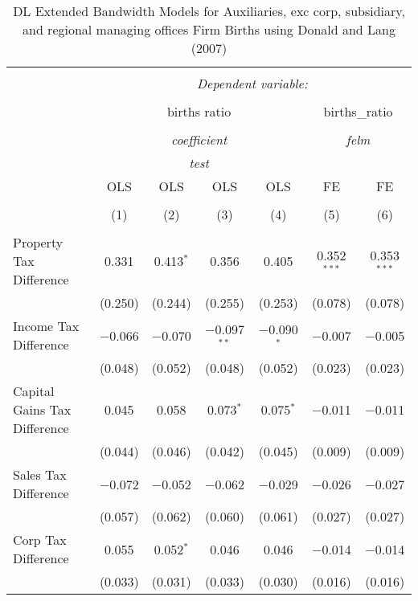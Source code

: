 
\begin{table}[!htbp] \centering 
  \caption{DL Extended Bandwidth Models for  Auxiliaries, exc corp, subsidiary, and regional managing offices Firm Births using Donald and Lang (2007)} 
  \label{} 
\begin{tabular}{@{\extracolsep{5pt}}lcccccc} 
\\[-1.8ex]\hline 
\hline \\[-1.8ex] 
 & \multicolumn{6}{c}{\textit{Dependent variable:}} \\ 
\cline{2-7} 
\\[-1.8ex] & \multicolumn{4}{c}{births ratio} & \multicolumn{2}{c}{births\_ratio} \\ 
\\[-1.8ex] & \multicolumn{4}{c}{\textit{coefficient}} & \multicolumn{2}{c}{\textit{felm}} \\ 
 & \multicolumn{4}{c}{\textit{test}} & \multicolumn{2}{c}{\textit{}} \\ 
 & OLS & OLS & OLS & OLS & FE & FE \\ 
\\[-1.8ex] & (1) & (2) & (3) & (4) & (5) & (6)\\ 
\hline \\[-1.8ex] 
 Property Tax Difference & 0.331 & 0.413$^{*}$ & 0.356 & 0.405 & 0.352$^{***}$ & 0.353$^{***}$ \\ 
  & (0.250) & (0.244) & (0.255) & (0.253) & (0.078) & (0.078) \\ 
  Income Tax Difference & $-$0.066 & $-$0.070 & $-$0.097$^{**}$ & $-$0.090$^{*}$ & $-$0.007 & $-$0.005 \\ 
  & (0.048) & (0.052) & (0.048) & (0.052) & (0.023) & (0.023) \\ 
  Capital Gains Tax Difference & 0.045 & 0.058 & 0.073$^{*}$ & 0.075$^{*}$ & $-$0.011 & $-$0.011 \\ 
  & (0.044) & (0.046) & (0.042) & (0.045) & (0.009) & (0.009) \\ 
  Sales Tax Difference & $-$0.072 & $-$0.052 & $-$0.062 & $-$0.029 & $-$0.026 & $-$0.027 \\ 
  & (0.057) & (0.062) & (0.060) & (0.061) & (0.027) & (0.027) \\ 
  Corp Tax Difference & 0.055 & 0.052$^{*}$ & 0.046 & 0.046 & $-$0.014 & $-$0.014 \\ 
  & (0.033) & (0.031) & (0.033) & (0.030) & (0.016) & (0.016) \\ 

\end{tabular}
\end{table}
